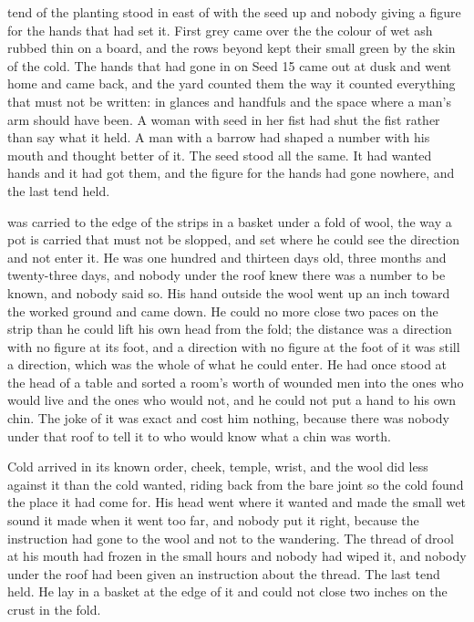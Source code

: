 
 tend of the planting stood in  east of  with the seed up and nobody giving a figure for the hands that had set it. First grey came over the  the colour of wet ash rubbed thin on a board, and the rows beyond  kept their small green by the skin of the cold. The hands that had gone in on Seed 15 came out at dusk and went home and came back, and the yard counted them the way it counted everything that must not be written: in glances and handfuls and the space where a man's arm should have been. A woman with seed in her fist had shut the fist rather than say what it held. A man with a barrow had shaped a number with his mouth and thought better of it. The seed stood all the same. It had wanted hands and it had got them, and the figure for the hands had gone nowhere, and the last tend held.

 was carried to the edge of the strips in a basket under a fold of wool, the way a pot is carried that must not be slopped, and set where he could see the direction and not enter it. He was one hundred and thirteen days old, three months and twenty-three days, and nobody under the roof knew there was a number to be known, and nobody said so. His hand outside the wool went up an inch toward the worked ground and came down. He could no more close two paces on the strip than he could lift his own head from the fold; the distance was a direction with no figure at its foot, and a direction with no figure at the foot of it was still a direction, which was the whole of what he could enter. He had once stood at the head of a table and sorted a room's worth of wounded men into the ones who would live and the ones who would not, and he could not put a hand to his own chin. The joke of it was exact and cost him nothing, because there was nobody under that roof to tell it to who would know what a chin was worth.

Cold arrived in its known order, cheek, temple, wrist, and the wool did less against it than the cold wanted, riding back from the bare joint so the cold found the place it had come for. His head went where it wanted and made the small wet sound it made when it went too far, and nobody put it right, because the instruction had gone to the wool and not to the wandering. The thread of drool at his mouth had frozen in the small hours and nobody had wiped it, and nobody under the roof had been given an instruction about the thread. The last tend held. He lay in a basket at the edge of it and could not close two inches on the crust in the fold.

